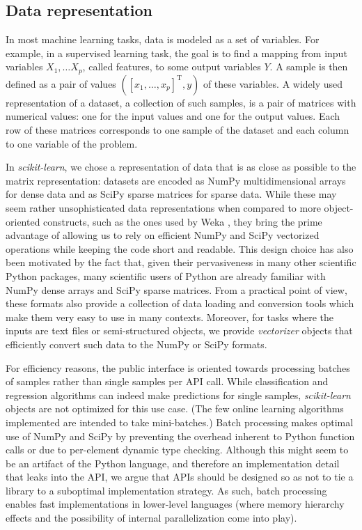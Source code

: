 \documentclass{llncs}
\newcommand{\sklearn}{\textit{scikit-learn}\xspace}
\begin{document}
\subsection{Data representation}
\label{sec:arrays}

In most machine learning tasks, data is modeled as a set of variables.  For
example, in a supervised learning task, the goal is to find a mapping
from input variables $X_1, \ldots X_p$, called features, to
some output variables $Y$. A sample is then defined as a pair of
values $([x_1, \ldots, x_p]^\mathrm{T}, y)$ of these variables. A widely used
representation of a dataset, a collection of
such samples, is a pair of matrices with numerical values: one for the input
values and one for the output values. Each row of these matrices
corresponds to one sample of the dataset and each column to one variable of
the problem.

In \sklearn, we chose a representation of data that is as close as
possible to the matrix representation: datasets are encoded as NumPy
multidimensional arrays for dense data and as SciPy sparse matrices for sparse
data. While these may seem rather unsophisticated data representations when
compared to more object-oriented constructs, such as the ones used by
Weka \citep{hall2009weka}, they bring the prime advantage of allowing us to rely
on efficient NumPy and SciPy vectorized operations while keeping
the code short and readable.  This design choice has also been motivated by
the fact that, given their pervasiveness in many other scientific Python
packages, many scientific users of Python are already familiar with NumPy dense
arrays and SciPy sparse matrices.
From a practical point of view, these formats also provide a collection of
data loading and conversion tools which make them very easy to use in many
contexts. Moreover, for tasks where the inputs are text files or semi-structured
objects, we provide \textit{vectorizer} objects that efficiently convert such
data to the NumPy or SciPy formats.

For efficiency reasons, the public interface is oriented towards processing
batches of samples rather than single samples per API call. While classification
and regression algorithms can indeed make predictions for single samples,
\sklearn objects are not optimized for this use case. (The few online learning
algorithms implemented are intended to take mini-batches.) Batch processing makes
optimal use of NumPy and SciPy by preventing the overhead inherent to Python
function calls or due to per-element dynamic type checking. Although this might
seem to be an artifact of the Python language, and therefore an implementation
detail that leaks into the API, we argue that APIs should be designed so as not
to tie a library to a suboptimal implementation strategy. As such, batch
processing enables fast implementations in lower-level languages (where memory
hierarchy effects and the possibility of internal parallelization come into
play).
\end{document}
